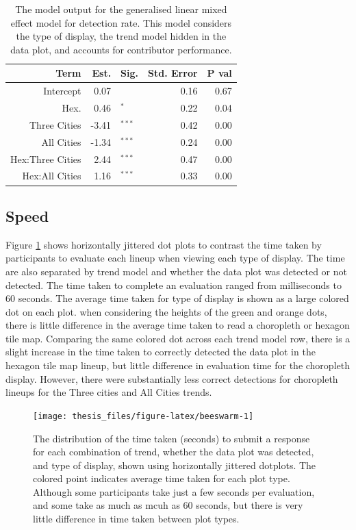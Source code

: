 \documentclass{monashthesis}
\begin{document}
\begin{table}[!h]

\caption{\label{tab:detect-glmer1}The model output for the generalised linear mixed effect model for detection rate. This model considers the type of display, the trend model hidden in the data plot, and accounts for contributor performance.}
\centering
\begin{tabular}[t]{rrlrr}
\toprule
Term & Est. & Sig. & Std. Error & P val\\
\midrule
Intercept & 0.07 & $^{ }$ & 0.16 & 0.67\\
Hex. & 0.46 & $^{*}$ & 0.22 & 0.04\\
\addlinespace
Three Cities & -3.41 & $^{***}$ & 0.42 & 0.00\\
All Cities & -1.34 & $^{***}$ & 0.24 & 0.00\\
\addlinespace
Hex:Three Cities & 2.44 & $^{***}$ & 0.47 & 0.00\\
Hex:All Cities & 1.16 & $^{***}$ & 0.33 & 0.00\\
\bottomrule
\end{tabular}
\end{table}

\hypertarget{speed}{%
\subsection{Speed}\label{speed}}

Figure \ref{fig:beeswarm} shows horizontally jittered dot plots to contrast the time taken by participants to evaluate each lineup when viewing each type of display. The time are also separated by trend model and whether the data plot was detected or not detected. The time taken to complete an evaluation ranged from milliseconds to 60 seconds. The average time taken for type of display is shown as a large colored dot on each plot. when considering the heights of the green and orange dots, there is little difference in the average time taken to read a choropleth or hexagon tile map. Comparing the same colored dot across each trend model row, there is a slight increase in the time taken to correctly detected the data plot in the hexagon tile map lineup, but little difference in evaluation time for the choropleth display. However, there were substantially less correct detections for choropleth lineups for the Three cities and All Cities trends.

\begin{figure}

{\centering \texttt{[image: thesis\_files/figure-latex/beeswarm-1]} 

}

\caption{The distribution of the time taken (seconds) to submit a response for each combination of trend, whether the data plot was detected, and type of display, shown using horizontally jittered dotplots. The colored point indicates average time taken for each plot type. Although some participants take just a few seconds per evaluation, and some take as much as mcuh as 60 seconds, but there is very little difference in time taken between plot types.}\label{fig:beeswarm}
\end{figure}
\end{document}
